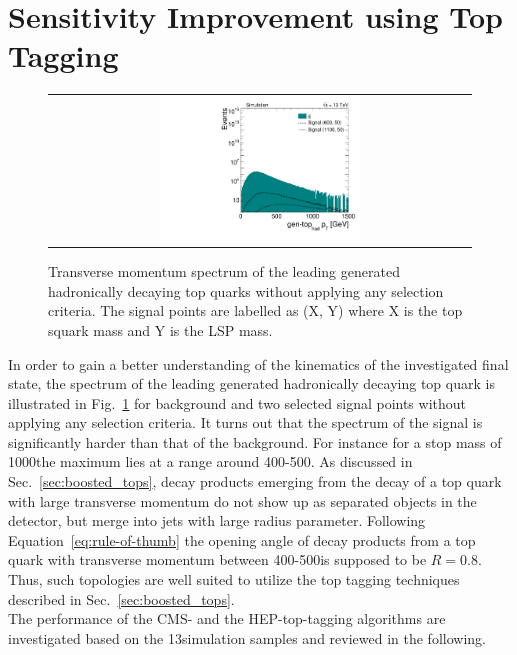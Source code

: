 \section{Sensitivity Improvement using Top Tagging}
\label{sec:stop_btagging}
\begin{figure}[!t]
  \centering
  \begin{tabular}{c}
                \includegraphics[width=0.49\textwidth]{figures/Stop_NoCuts_leading_had_t_ptgen.pdf} 
  \end{tabular}
  \caption{Transverse momentum spectrum of the leading generated hadronically decaying top quarks without applying any selection criteria. The signal points are labelled as (X, Y) where X is the top squark mass and Y is the LSP mass.}
  \label{fig:stop_gen_top_pt}
\end{figure} 
In order to gain a better understanding of the kinematics of the investigated final state, the \pt spectrum of the leading generated  hadronically decaying top quark is illustrated in Fig.~\ref{fig:stop_gen_top_pt} for \ttbar background and two selected signal points without applying any selection criteria. It turns out that the \pt spectrum of the signal is significantly harder than that of the \ttbar background. For instance for a stop mass of 1000\gev the maximum lies at a \pt range around 400-500\gev. As discussed in Sec.~\ref{sec:boosted_tops}, decay products emerging from the decay of a top quark with large transverse momentum do not show up as separated objects in the detector, but merge into jets with large radius parameter. Following Equation~\ref{eq:rule-of-thumb} the opening angle of decay products from a top quark with transverse momentum between 400-500\gev is supposed to be $R = 0.8$. Thus, such topologies are well suited to utilize the top tagging techniques described in Sec.~\ref{sec:boosted_tops}. \\
The performance of the CMS- and the HEP-top-tagging algorithms are investigated based on the 13\tev simulation samples and reviewed in the following. 
